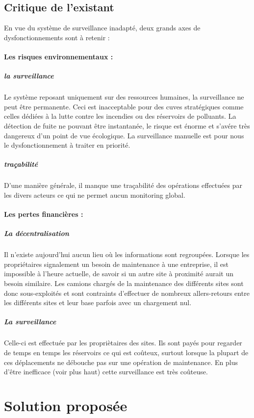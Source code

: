  \subsection{Critique de l'existant}
  
En vue du système de surveillance inadapté, deux grands axes de dysfonctionnements sont à retenir :
    \paragraph{Les risques environnementaux :}
      \subparagraph{la surveillance} Le système reposant uniquement sur des ressources humaines, la surveillance ne peut être permanente. Ceci est inacceptable pour des cuves stratégiques comme celles dédiées à la lutte contre les incendies ou des réservoirs de polluants. La détection de fuite ne pouvant être instantanée, le risque est énorme et s'avére très dangereux d'un point de vue écologique. La surveillance manuelle est pour nous le dysfonctionnement à traiter en priorité.
      
      \subparagraph{traçabilité} D'une manière générale, il manque une traçabilité des opérations effectuées par les divers acteurs ce qui ne permet aucun monitoring global.

      
    \paragraph{Les pertes financières :}
      \subparagraph{La décentralisation}
        Il n'existe aujourd'hui aucun lieu où les informations sont regroupées. Lorsque les propriétaires signalement un besoin de maintenance à une entreprise, il est impossible à l'heure actuelle, de savoir si un autre site à proximité aurait un besoin similaire. Les camions chargés de la maintenance des différents sites sont donc sous-exploités et sont contraints d'effectuer de nombreux allers-retours entre les différents sites et leur base parfois avec un chargement nul. 

      \subparagraph{La surveillance}Celle-ci est effectuée par les propriètaires des sites. Ils sont payés pour regarder de temps en temps les réservoirs ce qui est coûteux, surtout lorsque la plupart de ces déplacements ne débouche pas sur une opération de maintenance. En plus d'être inefficace (voir plus haut) cette surveillance est très coûteuse.

\section{Solution proposée}  
